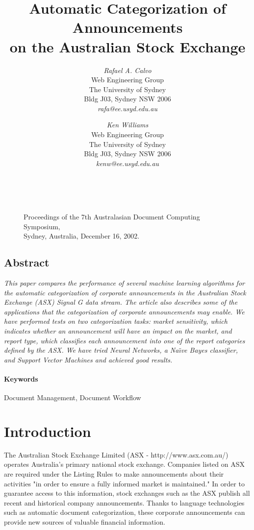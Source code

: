 \documentclass[twocolumn]{article}
\title{Automatic Categorization of Announcements \\ on the Australian Stock Exchange}
\author{
{\em Rafael A. Calvo}\\[1ex]
Web Engineering Group\\
The University of Sydney\\
Bldg J03, Sydney NSW 2006\\[1ex]
{\em rafa@ee.usyd.edu.au}
\and
{\em Ken Williams}\\[1ex]
Web Engineering Group\\
The University of Sydney\\
Bldg J03, Sydney NSW 2006\\[1ex]
{\em kenw@ee.usyd.edu.au}
}
\date{}
\begin{document}
\maketitle
\thispagestyle{empty}

        \begin{figure}[b]
	~\\
        \noindent
        {\small\bf\raggedright
        Proceedings of the 7th Australasian 
	Document Computing Symposium,\\
	Sydney, Australia,
        December 16, 2002.
        }
        \end{figure}


\subsection*{\centering Abstract}
\noindent
{\it 
This paper compares the performance of several machine learning
algorithms for the automatic categorization of corporate announcements
in the Australian Stock Exchange (ASX) Signal G data stream. The
article also describes some of the applications that the
categorization of corporate announcements may enable. We have
performed tests on two categorization tasks: market sensitivity, which
indicates whether an announcement will have an impact on the market,
and report type, which classifies each announcement into one of the
report categories defined by the ASX. We have tried Neural Networks, a
Na\"\i ve Bayes classifier, and Support Vector Machines and achieved
good results.
}

\paragraph{Keywords} 
Document Management, Document Workflow

\section{Introduction}
\label{introduction}

The Australian Stock Exchange Limited (ASX - http://www.asx.com.au/)
operates Australia's primary national stock exchange.  Companies
listed on ASX are required under the Listing Rules to make
announcements about their activities "in order to ensure a fully
informed market is maintained." \cite{asx:02} In order to guarantee
access to this information, stock exchanges such as the ASX publish
all recent and historical company announcements.  Thanks to language
technologies such as automatic document categorization, these
corporate announcements can provide new sources of valuable financial
information.
\end{document}
